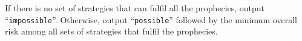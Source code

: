 
If there is no set of strategies that can fulfil all the prophecies, output ``\texttt{impossible}''. Otherwise, output ``\texttt{possible}'' followed by the minimum overall risk among all sets of strategies that fulfil the prophecies.
